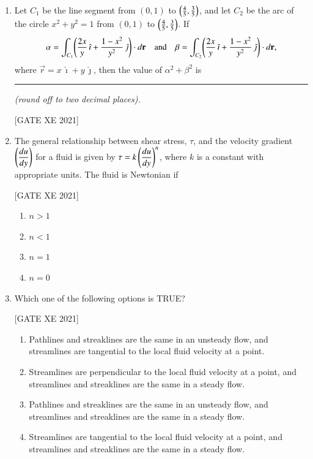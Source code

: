 \documentclass[journal,12pt,onecolumn]{IEEEtran}
\theoremstyle{remark}
\begin{document}
\begin{enumerate}
\item
Let $C_1$ be the line segment from $(0,1)$ to $\left(\tfrac{4}{5},\tfrac{3}{5}\right)$, and let $C_2$ be the arc of the circle $x^{2}+y^{2}=1$ from $(0,1)$ to $\left(\tfrac{4}{5},\tfrac{3}{5}\right)$. If
\begin{align}
    \alpha=\int_{C_1}\!\left(\frac{2x}{y}\,\hat{\imath}+\frac{1-x^{2}}{y^{2}}\,\hat{\jmath}\right)\cdot d\mathbf{r}
\quad\text{and}\quad
\beta=\int_{C_2}\!\left(\frac{2x}{y}\,\hat{\imath}+\frac{1-x^{2}}{y^{2}}\,\hat{\jmath}\right)\cdot d\mathbf{r},
\end{align}
where $\vec{r}=x\,\hat{\imath}+y\,\hat{\jmath}$, then the value of $\alpha^{2}+\beta^{2}$ is \rule{2.5cm}{0.15mm} \textit{(round off to two decimal places).}

\hfill[GATE XE 2021]


\item The general relationship between shear stress, $\tau$, and the velocity gradient $\left(\dfrac{du}{dy}\right)$ for a fluid is given by
$\displaystyle \tau = k \left(\dfrac{du}{dy}\right)^{n}$, where $k$ is a constant with appropriate units. The fluid is Newtonian if


\hfill[GATE XE 2021]


\begin{multicols}{2}
\begin{enumerate}
\item $n > 1$
\item $n < 1$
\item $n = 1$
\item $n = 0$
\end{enumerate}
\end{multicols}

\vspace{0.8\baselineskip}

\item Which one of the following options is TRUE?


\hfill[GATE XE 2021]


\begin{multicols}{2}
\begin{enumerate}
\item Pathlines and streaklines are the same in an unsteady flow, and streamlines are tangential to the local fluid velocity at a point.
\item Streamlines are perpendicular to the local fluid velocity at a point, and streamlines and streaklines are the same in a steady flow.
\item Pathlines and streaklines are the same in an unsteady flow, and streamlines and streaklines are the same in a steady flow.
\item Streamlines are tangential to the local fluid velocity at a point, and streamlines and streaklines are the same in a steady flow.
\end{enumerate}
\end{multicols}


\end{enumerate}
\end{document}
